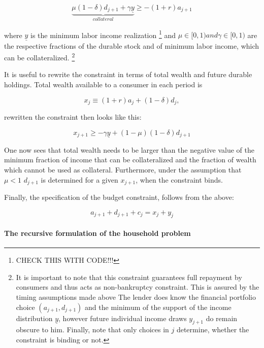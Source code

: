 \documentclass[a4paper,12pt]{article}
\begin{document}
\begin{equation}
\underbrace{\mu(1-\delta)d_{j+1} + \gamma\underline{y}}_{collateral} \geq -(1+r)a_{j+1}
\end{equation}

where $\underline{y}$ is the minimum labor income realization \footnote{CHECK THIS WITH CODE!!!} and $\mu \in [0,1) and \gamma \in [0,1)$ are the respective fractions of the durable stock and of minimum labor income, which can be collateralized.
\footnote{It is important to note that this constraint guarantees full repayment by consumers and thus acts as non-bankruptcy constraint. This is assured by the timing assumptions made above \textendash The lender does know the financial portfolio choice $(a_{j+1},d_{j+1})$ and the minimum of the support of the income distribution $\underline{y}$, however future individual income draws $y_{j+1}$ do remain obscure to him. Finally, note that only choices in $j$ determine, whether the constraint is binding or not. }

It is useful to rewrite the constraint in terms of total wealth and future durable holdings. Total wealth available to a consumer in each period is 

\begin{equation}
x_{j} \equiv (1+r)a_{j} + (1-\delta)d_{j},
\end{equation}

rewritten the constraint then looks like this:

\begin{equation}
x_{j+1} \geq -\gamma\underline{y}+(1-\mu)(1-\delta)d_{j+1}
\end{equation}

One now sees that total wealth needs to be larger than the negative value of the minimum fraction of income that can be collateralized and the fraction of wealth which cannot be used as collateral. Furthermore, under the assumption that $\mu < 1$ $d_{j+1}$ is determined for a given $x_{j+1}$, when the constraint binds.

Finally, the specification of the budget constraint, follows from the above:

\begin{equation}
a_{j+1}+d_{j+1}+c_{j}=x_{j}+y_{j}
\end{equation}



\paragraph{The recursive formulation of the household problem} 
\end{document}
